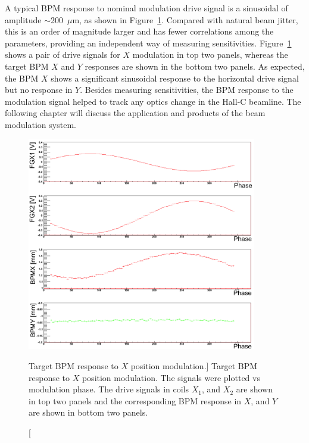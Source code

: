 A typical BPM response to nominal modulation drive signal is a sinusoidal of amplitude $\sim$200~$\mu$m, as shown in Figure~\ref{fig:BModBPMResponse}. Compared with natural beam jitter, this is an order of magnitude larger and has fewer correlations among the parameters, providing an independent way of measuring sensitivities. Figure~\ref{fig:BModBPMResponse} shows a pair of drive signals for $X$ modulation in top two panels, whereas the target BPM $X$ and $Y$ responses are shown in the bottom two panels. As expected, the BPM $X$ shows a significant sinusoidal response to the horizontal drive signal but no response in $Y$. Besides measuring sensitivities, the BPM response to the modulation signal helped to track any optics change in the Hall-C beamline. The following chapter will discuss the application and products of the beam modulation system.

\begin{singlespace}
\begin{figure}[!h]
	\begin{center}
	\includegraphics[width=10.0cm]{figures/BModBPMResponse}
	\end{center}
	\caption
	[Target BPM response to $X$ position modulation.]
	{Target BPM response to $X$ position modulation. The signals were plotted vs modulation phase. The drive signals in coils $X_{1}$, and $X_{2}$ are shown in top two panels and the corresponding BPM response in $X$, and $Y$ are shown in bottom two panels.}
	\label{fig:BModBPMResponse}
\end{figure}
\end{singlespace}


